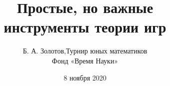\documentclass[aspectratio=1610,12pt,notheorems]{beamer}
\title[Introduction to Game Theory]
    {\bfseries Простые, но важные \\ инструменты теории игр}
\author[\ ]
	{Б. А. Золотов,\quad Турнир юных математиков\\ \vspace{0.3cm}
		{\small Фонд «Время Науки»}}
\institute[\ ]{\ }
\date{8 ноября 2020}
\begin{document}
\frame{\titlepage}




\end{document}
